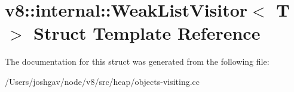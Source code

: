 \hypertarget{structv8_1_1internal_1_1_weak_list_visitor}{}\section{v8\+:\+:internal\+:\+:Weak\+List\+Visitor$<$ T $>$ Struct Template Reference}
\label{structv8_1_1internal_1_1_weak_list_visitor}


The documentation for this struct was generated from the following file\+:\begin{DoxyCompactItemize}
\item 
/\+Users/joshgav/node/v8/src/heap/objects-\/visiting.\+cc\end{DoxyCompactItemize}
